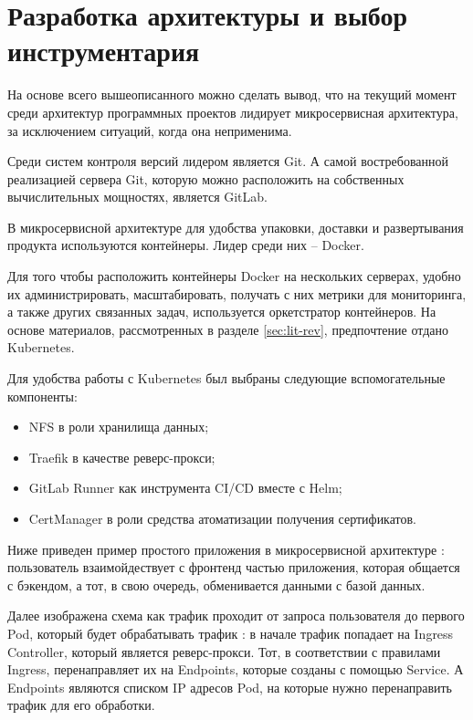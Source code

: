 \section{Разработка архитектуры и выбор инструментария}
\label{sec:tools}

На основе всего вышеописанного можно сделать вывод, что на текущий момент среди архитектур программных проектов лидирует микросервисная архитектура, за исключением ситуаций, когда она неприменима.

Среди систем контроля версий лидером является Git. А самой востребованной реализацией сервера Git, которую можно расположить на собственных вычислительных мощностях, является GitLab.

В микросервисной архитектуре для удобства упаковки, доставки и развертывания продукта используются контейнеры. Лидер среди них -- Docker.

Для того чтобы расположить контейнеры Docker на нескольких серверах, удобно их администрировать, масштабировать, получать с них метрики для мониторинга, а также других связанных задач, используется оркетстратор контейнеров. На основе материалов, рассмотренных в разделе \ref{sec:lit-rev}, предпочтение отдано Kubernetes.

Для удобства работы с Kubernetes был выбраны следующие вспомогательные компоненты:
\begin{itemize}
    \item NFS в роли хранилища данных;
    \item Traefik в качестве реверс-прокси;
    \item GitLab Runner как инструмента CI/CD вместе с Helm;
    \item CertManager в роли средства атоматизации получения сертификатов.
\end{itemize}

Ниже приведен пример простого приложения в микросервисной архитектуре : пользователь взаимойдествует с фронтенд частью приложения, которая общается с бэкендом, а тот, в свою очередь, обменивается данными с базой данных.

Далее изображена схема как трафик проходит от запроса пользователя до первого Pod, который будет обрабатывать трафик : в начале трафик попадает на Ingress Controller, который является реверс-прокси.
Тот, в соответствии с правилами Ingress, перенаправляет их на Endpoints, которые созданы с помощью Service. А Endpoints являются списком IP адресов Pod, на которые нужно перенаправить трафик для его обработки.

